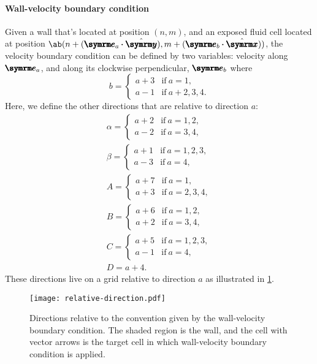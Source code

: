\paragraph{Wall-velocity boundary condition} Given a wall that's located at position $(n, m)$, and an exposed fluid cell located at position $\ab(n + (\vv{e}_a\vdot\yhat), m + (\vv{e}_b\vdot\xhat))$, the velocity boundary condition can be defined by two variables: velocity along $\vv{e}_a$, and along its clockwise perpendicular, $\vv{e}_b$ where
\begin{equation}
	b = \begin{cases}
		a + 3 & \textrm{if} ~ a = 1,       \\
		a - 1 & \textrm{if} ~ a + 2, 3, 4.
	\end{cases}
\end{equation}
Here, we define the other directions that are relative to direction $a$:
\begin{gather}
	\alpha = \begin{cases}
		a + 2 & \textrm{if} ~ a = 1, 2, \\
		a - 2 & \textrm{if} ~ a = 3, 4,
	\end{cases} \\
	\beta = \begin{cases}
		a + 1 & \textrm{if} ~ a = 1, 2, 3, \\
		a - 3 & \textrm{if} ~ a = 4,
	\end{cases} \\
	A = \begin{cases}
		a + 7 & \textrm{if} ~ a = 1,       \\
		a + 3 & \textrm{if} ~ a = 2, 3, 4,
	\end{cases} \\
	B = \begin{cases}
		a + 6 & \textrm{if} ~ a = 1, 2, \\
		a + 2 & \textrm{if} ~ a = 3, 4,
	\end{cases} \\
	C = \begin{cases}
		a + 5 & \textrm{if} ~ a = 1, 2, 3, \\
		a - 1 & \textrm{if} ~ a = 4,
	\end{cases} \\
	D = a + 4.
\end{gather}
These directions live on a grid relative to direction $a$ as illustrated in \cref{fig:relative-direction}.
\begin{figure}[ht]
	\centering
	\texttt{[image: relative-direction.pdf]}
	\caption{Directions relative to the convention given by the wall-velocity boundary condition. The shaded region is the wall, and the cell with vector arrows is the target cell in which wall-velocity boundary condition is applied.}
	\label{fig:relative-direction}
\end{figure}
